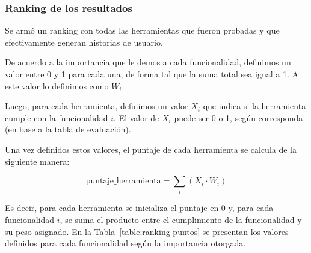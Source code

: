 \subsubsection{Ranking de los resultados}

Se armó un ranking con todas las herramientas que fueron probadas y que
efectivamente generan historias de usuario.

De acuerdo a la importancia que le demos a cada funcionalidad, definimos un valor
entre 0 y 1 para cada una, de forma tal que la suma total sea igual a 1.  
A este valor lo definimos como $W_i$.

Luego, para cada herramienta, definimos un valor $X_i$ que indica si la herramienta
cumple con la funcionalidad $i$.  
El valor de $X_i$ puede ser 0 o 1, según corresponda (en base a la tabla de evaluación).

Una vez definidos estos valores, el puntaje de cada herramienta se calcula de la siguiente manera:

\[
\text{puntaje\_herramienta} = \sum_{i} (X_i \cdot W_i)
\]

Es decir, para cada herramienta se inicializa el puntaje en 0 y, para cada funcionalidad $i$,
se suma el producto entre el cumplimiento de la funcionalidad y su peso asignado.
En la Tabla~\ref{table:ranking-puntos} se presentan los valores definidos para cada funcionalidad según la importancia otorgada.

